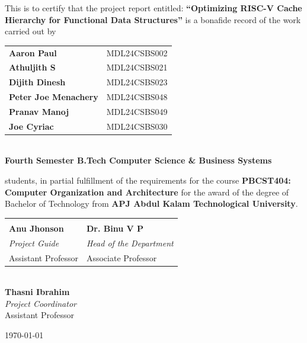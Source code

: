 \documentclass[12pt, a4paper]{report}
\begin{document}
\noindent
This is to certify that the project report entitled:
    \large{\bfseries{ ``Optimizing RISC-V Cache Hierarchy for Functional Data Structures''}}
\noindent
is a bonafide record of the work carried out by
\begin{center}
    \begin{tabular}{l r}
        \bfseries Aaron Paul & MDL24CSBS002 \\
        \bfseries Athuljith S & MDL24CSBS021 \\
        \bfseries Dijith Dinesh & MDL24CSBS023 \\
        \bfseries Peter Joe Menachery & MDL24CSBS048 \\
        \bfseries Pranav Manoj & MDL24CSBS049 \\
        \bfseries Joe Cyriac & MDL24CSBS030 \\
    \end{tabular}\\
    \textbf{Fourth Semester B.Tech Computer Science \& Business Systems}
\end{center}

\noindent
students, in partial fulfillment of the requirements for the course \textbf{PBCST404: Computer Organization and Architecture} for the award of the degree of Bachelor of Technology from \textbf{APJ Abdul Kalam Technological University}.

\vfill

\begin{tabular}{p{} p{}}
    \hrulefill & \hfill \hrulefill \\
    \textbf{Anu Jhonson} & \hfill \textbf{Dr. Binu V P} \\
    \textit{Project Guide} & \hfill \textit{Head of the Department} \\
    Assistant Professor & \hfill Associate Professor \\
\end{tabular}

\vspace{0.5cm}
\begin{center}
    \hrulefill \\
    \textbf{Thasni Ibrahim} \\
    \textit{Project Coordinator} \\
    Assistant Professor \\
\end{center}
\vspace{0.5cm}
\begin{flushleft} \today \end{flushleft}
\end{document}
